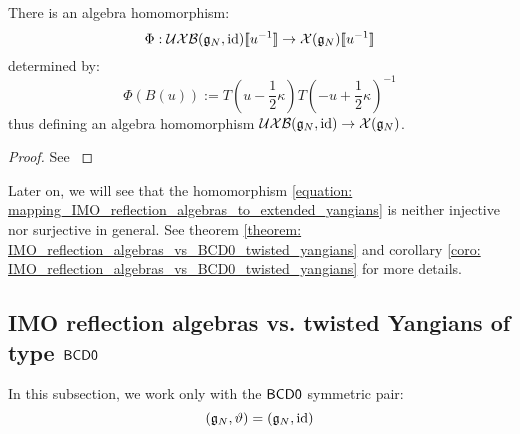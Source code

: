         \begin{proposition} \label{prop: mapping_IMO_reflection_algebras_to_extended_yangians}
            There is an algebra homomorphism:
                \begin{equation} \label{equation: mapping_IMO_reflection_algebras_to_extended_yangians}
                    \Phi: \mathcal{UXB}(\mathfrak{g}_N, \mathrm{id})[\![u^{-1}]\!] \to \mathcal{X}(\mathfrak{g}_N)[\![u^{-1}]\!]
                \end{equation}
            determined by:
                $$\Phi(B(u)) := T\left(u - \frac12 \kappa\right) T\left(-u + \frac12 \kappa\right)^{-1}$$
            thus defining an algebra homomorphism $\mathcal{UXB}(\mathfrak{g}_N, \mathrm{id}) \to \mathcal{X}(\mathfrak{g}_N)$.
        \end{proposition}
            \begin{proof}
                See \cite[Proposition 3.2]{isaev_molev_ogievetsky_fusion_for_brauer_algebras_2}
            \end{proof}
        \begin{remark}
            Later on, we will see that the homomorphism \eqref{equation: mapping_IMO_reflection_algebras_to_extended_yangians} is neither injective nor surjective in general. See theorem \ref{theorem: IMO_reflection_algebras_vs_BCD0_twisted_yangians} and corollary \ref{coro: IMO_reflection_algebras_vs_BCD0_twisted_yangians} for more details.
        \end{remark}

    \subsection{IMO reflection algebras vs. twisted Yangians of type \texorpdfstring{$\mathsf{B}\mathsf{C}\mathsf{D}\mathsf{0}$}{}}
        In this subsection, we work only with the $\mathsf{B}\mathsf{C}\mathsf{D}\mathsf{0}$ symmetric pair:
            $$(\mathfrak{g}_N, \vartheta) = (\mathfrak{g}_N, \mathrm{id})$$


